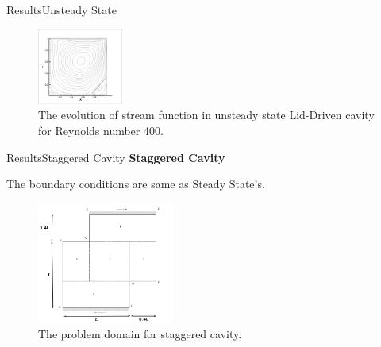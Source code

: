 \documentclass[11pt]{beamer}
\begin{document}
\begin{frame}{Results}{Unsteady State}
\begin{figure}[hH]
\includegraphics[width=0.25\textwidth]{images/unsteady/re4004}
\caption{The evolution of stream function in unsteady state Lid-Driven cavity for Reynolds number 400. }
\end{figure}
\end{frame}


\begin{frame}{Results}{Staggered Cavity}
\textbf{Staggered Cavity}\linebreak

The boundary conditions are same as Steady State's.
\begin{figure}[H]
\centerline{\includegraphics[width=0.4\textwidth]{images/stagerred/domain1.png}}
\caption{The problem domain for staggered cavity.}
\end{figure}
\end{frame}
\end{document}
